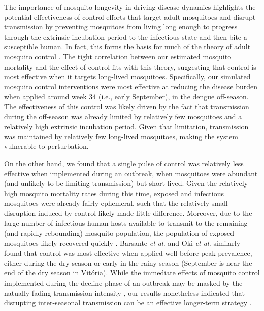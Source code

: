\documentclass[10pt,letterpaper]{article}
\begin{document}
The importance of mosquito longevity in driving disease dynamics highlights the potential effectiveness of control efforts that target adult mosquitoes and disrupt transmission by preventing mosquitoes from living long enough to progress through the extrinsic incubation period to the infectious state and then bite a susceptible human.
In fact, this forms the basis for much of the theory of adult mosquito control \cite{Burattini2008, Morrison2008, Smith2012}.
The tight correlation between our estimated mosquito mortality and the effect of control fits with this theory, suggesting that control is most effective when it targets long-lived mosquitoes.  
Specifically, our simulated mosquito control interventions were most effective at reducing the disease burden when applied around week 34 (i.e., early September), in the dengue off-season.
The effectiveness of this control was likely driven by the fact that transmission during the off-season was already limited by relatively few mosquitoes and a relatively high extrinsic incubation period.
Given that limitation, transmission was maintained by relatively few long-lived mosquitoes, making the system vulnerable to perturbation.

On the other hand, we found that a single pulse of control was relatively less effective when implemented during an outbreak, when mosquitoes were abundant (and unlikely to be limiting transmission) but short-lived.
Given the relatively high mosquito mortality rates during this time, exposed and infectious mosquitoes were already fairly ephemeral, such that the relatively small disruption induced by control likely made little difference.
Moreover, due to the large number of infectious human hosts available to transmit to the remaining (and rapidly rebounding) mosquito population, the population of exposed mosquitoes likely recovered quickly \cite{Newton1992, Burattini2008}.
Barsante \emph{et al.} \cite{Barsante2015} and Oki \emph{et al.} \cite{Oki2011} similarly found that control was most effective when applied well before peak prevalence, either during the dry season \cite{Barsante2015} or early in the rainy season \cite{Oki2011} (September is near the end of the dry season in Vit\'oria).
While the immediate effects of mosquito control implemented during the decline phase of an outbreak may be masked by the natually fading transmission intensity \cite{Stoddard2014}, our results nonetheless indicated that disrupting inter-seasonal transmission can be an effective longer-term strategy \cite{Hladish2018}.
\end{document}
